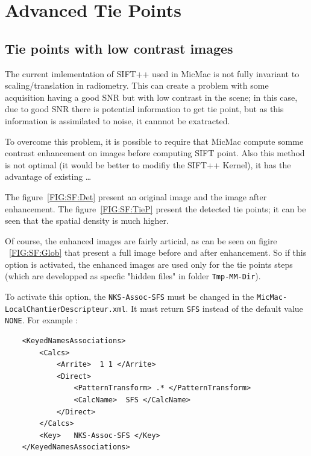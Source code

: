 \chapter{Advanced Tie Points}



\section{Tie points with low contrast images}


The current imlementation of SIFT++ used in MicMac is not fully invariant to scaling/translation in radiometry. This can create a problem with some acquisition having a good SNR but with low contrast  in the scene; in this case, due to good SNR there is potential information to get tie point, but as this information is assimilated to noise, it cannnot be exatracted.

To overcome this problem, it is possible to require that MicMac compute somme contrast enhancement on images before computing SIFT point. Also this method is not optimal (it would be better to modifiy the SIFT++ Kernel), it has the advantage of existing \dots



The figure~\ref{FIG:SF:Det} present an original image and the image after enhancement. The figure~\ref{FIG:SF:TieP} present the detected tie points; it can be seen that the spatial density is much higher. 

Of course, the enhanced images are fairly articial, as can be seen on figire ~\ref{FIG:SF:Glob} that present a full image before and after enhancement. So if this option is activated, the enhanced images are used only for the tie points steps (which are developped as specfic "hidden files" in folder {\tt Tmp-MM-Dir}).


To activate this option, the {\tt NKS-Assoc-SFS} must be changed in the {\tt MicMac-LocalChantierDescripteur.xml}. It must return {\tt SFS} instead of the default value {\tt NONE}. For example :

\begin{verbatim}
    <KeyedNamesAssociations>
        <Calcs>
            <Arrite>  1 1 </Arrite>
            <Direct>
                <PatternTransform> .* </PatternTransform>
                <CalcName>  SFS </CalcName>
            </Direct>
        </Calcs>
        <Key>   NKS-Assoc-SFS </Key>
    </KeyedNamesAssociations>
\end{verbatim}

